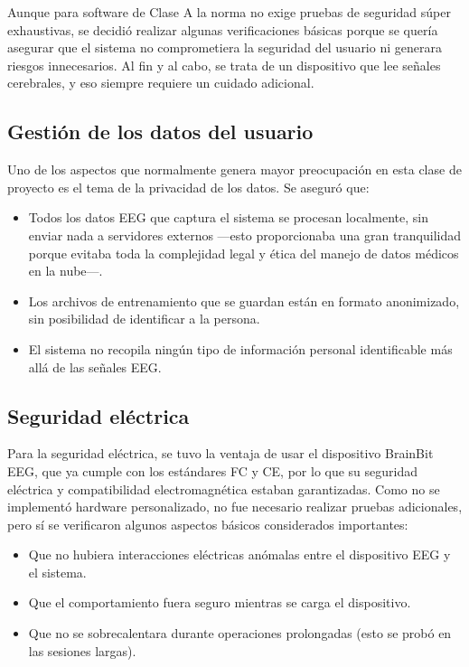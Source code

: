 Aunque para software de Clase A la norma no exige pruebas de seguridad súper exhaustivas, se decidió realizar algunas verificaciones básicas porque se quería asegurar que el sistema no comprometiera la seguridad del usuario ni generara riesgos innecesarios. Al fin y al cabo, se trata de un dispositivo que lee señales cerebrales, y eso siempre requiere un cuidado adicional.

\subsection{Gestión de los datos del usuario}

Uno de los aspectos que normalmente genera mayor preocupación en esta clase de proyecto es el tema de la privacidad de los datos. Se aseguró que:

\begin{itemize}
    \item Todos los datos EEG que captura el sistema se procesan localmente, sin enviar nada a servidores externos —esto proporcionaba una gran tranquilidad porque evitaba toda la complejidad legal y ética del manejo de datos médicos en la nube—.
    \item Los archivos de entrenamiento que se guardan están en formato anonimizado, sin posibilidad de identificar a la persona.
    \item El sistema no recopila ningún tipo de información personal identificable más allá de las señales EEG.
\end{itemize}

\subsection{Seguridad eléctrica}

Para la seguridad eléctrica, se tuvo la ventaja de usar el dispositivo BrainBit EEG, que ya cumple con los estándares FC y CE, por lo que su seguridad eléctrica y compatibilidad electromagnética estaban garantizadas. Como no se implementó hardware personalizado, no fue necesario realizar pruebas adicionales, pero sí se verificaron algunos aspectos básicos considerados importantes:

\begin{itemize}
    \item Que no hubiera interacciones eléctricas anómalas entre el dispositivo EEG y el sistema.
    \item Que el comportamiento fuera seguro mientras se carga el dispositivo.
    \item Que no se sobrecalentara durante operaciones prolongadas (esto se probó en las sesiones largas).
\end{itemize}

